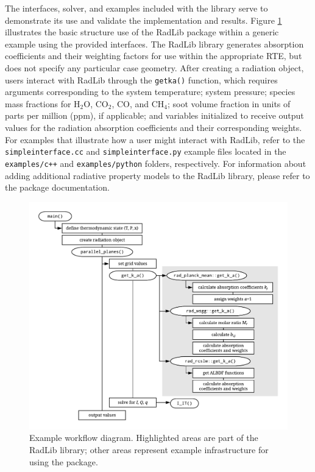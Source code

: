 \documentclass[preprint,12pt]{elsarticle}
\begin{document}
The interfaces, solver, and examples included with the library serve to demonstrate its use and validate the implementation and results. Figure \ref{fig:flowchart} illustrates the basic structure use of the RadLib package within a generic example using the provided interfaces. The RadLib library generates absorption coefficients and their weighting factors for use within the appropriate RTE, but does not specify any particular case geometry. After creating a radiation object, users interact with RadLib through the \texttt{get\textunderscore k\textunderscore a()} function, which requires arguments corresponding to the system temperature; system pressure; species mass fractions for H$_2$O, CO$_2$, CO, and CH$_4$; soot volume fraction in units of parts per million (ppm), if applicable; and variables initialized to receive output values for the radiation absorption coefficients and their corresponding weights. For examples that illustrate how a user might interact with RadLib, refer to the \texttt{simple\textunderscore interface.cc} and \texttt{simple\textunderscore interface.py} example files located in the \texttt{examples/c++} and \texttt{examples/python} folders, respectively. For information about adding additional radiative property models to the RadLib library, please refer to the package documentation. 
%
\begin{figure}
	\begin{center}
        \includegraphics[width=\textwidth]{fig_radlib_structure.pdf}
	\end{center}
	\caption{Example workflow diagram. Highlighted areas are part of the RadLib library; other areas represent example infrastructure for using the package.}
\label{fig:flowchart}
\end{figure}
%
\end{document}
